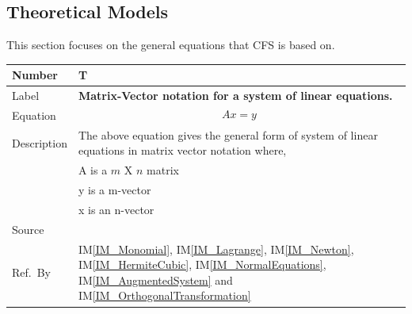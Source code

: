 \documentclass[12pt]{article}
\newcommand{\colAwidth}{0.13\textwidth}
\newcommand{\colBwidth}{0.82\textwidth}
\newcounter{theorynum} %
\newcommand{\iref}[1]{IM\ref{#1}}
\newcommand{\famname}{CFS} %
\begin{document}
\subsection{Theoretical Models} \label{sec_theoretical}

This section focuses on the general equations that \famname{} is based on.
~\newline


\noindent
\begin{minipage}{\textwidth}
	\renewcommand*{\arraystretch}{1.5}
	\begin{tabular}{| p{\colAwidth} | p{\colBwidth}|}
		\hline
		\rowcolor[gray]{0.9}
		Number& T{theorynum}\thetheorynum \label{T_LinearEqMatrix}\\
		\hline
		Label&\bf Matrix-Vector notation for a system of linear equations.\\
		\hline
		Equation& \begin{equation*}
		Ax = y
		\end{equation*} \\
		\hline
		Description & The above equation gives the general form of system of linear equations in matrix vector notation where,\\
		& A is a $m$ X $n$ matrix\\
		& y is a m-vector\\
		& x is an n-vector\\
		\hline
		Source & ~\cite{Health1997}\\
		
		\hline
		Ref.\ By & \iref{IM_Monomial}, \iref{IM_Lagrange}, \iref{IM_Newton}, \iref{IM_HermiteCubic}, \iref{IM_NormalEquations}, \iref{IM_AugmentedSystem} and \iref{IM_OrthogonalTransformation}\\
		\hline
	\end{tabular}
\end{minipage}\\
~\newline
\end{document}
